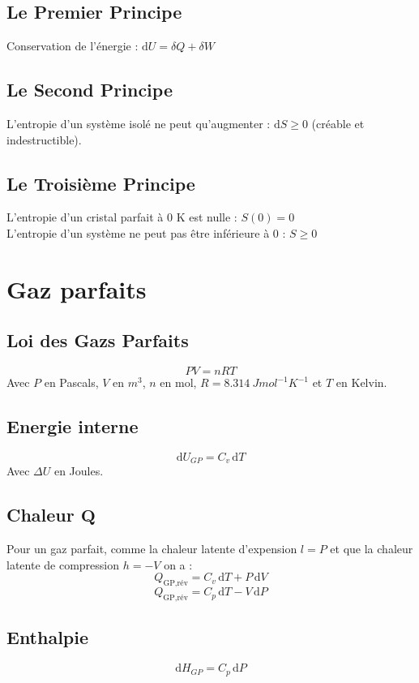 \documentclass[a4paper,12pt]{article}
\newcommand{\diff}{\mathrm{d}} %
\begin{document}
    \begin{multicols}{2}

        \subsection*{Le Premier Principe}
        Conservation de l'énergie : $\boxed{\diff U = \delta Q + \delta W}$

        \subsection*{Le Second Principe}
        L'entropie d'un système isolé ne peut qu'augmenter : $\boxed{\diff S \geq 0}$ (créable et indestructible).

        \subsection*{Le Troisième Principe}
        L'entropie d'un cristal parfait à 0 K est nulle : $\boxed{S(0) = 0}$\\
        L'entropie d'un système ne peut pas être inférieure à 0 : $\boxed{S \geq 0}$

    \end{multicols}



\section{Gaz parfaits}

    \begin{multicols}{2}
        
        \subsection*{Loi des Gazs Parfaits}
            $$ \boxed{PV = nRT} $$
            Avec $P$ en Pascals, $V$ en $m^3$, $n$ en mol, $ R=\qty{8.314}{J mol^{-1} K^{-1}} $ et $T$ en Kelvin. 
        
        \subsection*{Energie interne}
            $$ \boxed{ \diff U_{GP} = C_v \, \diff T } $$
            Avec $\Delta U$ en Joules.

        \subsection*{Chaleur $\bm{Q}$}
            Pour un gaz parfait, comme la chaleur latente d'expension $l=P$ et que la chaleur latente de compression $h=-V$ on a :
                $$ \boxed{ Q_{\text{GP,rév}} = C_v \, \diff T + P \, \diff V } $$
                $$ \boxed{ Q_{\text{GP,rév}} = C_p \, \diff T - V \, \diff P } $$

        \subsection*{Enthalpie}
            $$ \boxed{ \diff H_{GP} = C_p \, \diff P } $$

    \end{multicols}
\end{document}
